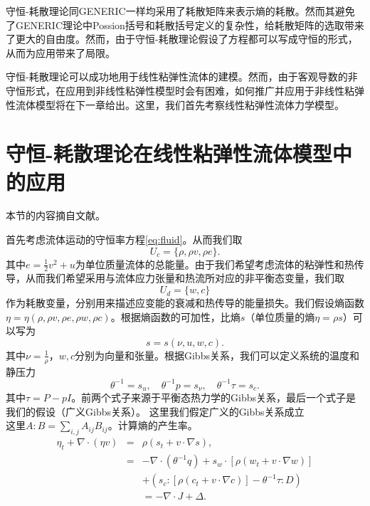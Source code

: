 \documentclass{article}
\begin{document}
	守恒-耗散理论同GENERIC一样均采用了耗散矩阵来表示熵的耗散。然而其避免了GENERIC理论中Possion括号和耗散括号定义的复杂性，给耗散矩阵的选取带来了更大的自由度。然而，由于守恒-耗散理论假设了方程都可以写成守恒的形式，从而为应用带来了局限。

	守恒-耗散理论可以成功地用于线性粘弹性流体的建模。然而，由于客观导数的非守恒形式，在应用到非线性粘弹性模型时会有困难，如何推广并应用于非线性粘弹性流体模型将在下一章给出。这里，我们首先考察线性粘弹性流体力学模型。

	\section{守恒-耗散理论在线性粘弹性流体模型中的应用}
	本节的内容摘自文献\cite{}。

	首先考虑流体运动的守恒率方程\eqref{eq:fluid}。从而我们取
	\begin{equation*}
		U_c = \{\rho, \rho v, \rho e\}.
	\end{equation*}
	其中$e = \frac{1}{2} v^2 + u$为单位质量流体的总能量。由于我们希望考虑流体的粘弹性和热传导，从而我们希望采用与流体应力张量和热流所对应的非平衡态变量，我们取
	\begin{equation*}
		U_d = \{ w, c\}
	\end{equation*}
	作为耗散变量，分别用来描述应变能的衰减和热传导的能量损失。我们假设熵函数$\eta = \eta (\rho,\rho v ,\rho e, \rho w, \rho c)$。根据熵函数的可加性，比熵$s$（单位质量的熵$\eta = \rho s$）可以写为
	\begin{equation}
		s = s(\nu, u, w, c).
	\end{equation}
	其中$\nu = \frac{1}{\rho}$，$w,c$分别为向量和张量。根据Gibbs关系，我们可以定义系统的温度和静压力
	\begin{equation}
		\theta^{-1} = s_u, \quad \theta^{-1} p = s_{\nu}, \quad \theta^{-1} \tau = s_c.
	\end{equation}
	其中$\tau = P - pI$。前两个式子来源于平衡态热力学的Gibbs关系，最后一个式子是我们的假设（广义Gibbs关系）。
	这里我们假定广义的Gibbs关系成立
	\begin{equation*}
   	\end{equation*}
	这里$A:B = \sum_{i,j}A_{ij}B_{ij}$。计算熵的产生率。
	\begin{eqnarray*}
		\eta_t + \nabla \cdot (\eta v) &=& \rho (s_t + v \cdot \nabla s), \\
		&=& -\nabla \cdot (\theta^{-1} q) + s_w \cdot [\rho (w_t + v \cdot \nabla w)] \\
		&&+ (s_c:[\rho (c_t + v \cdot \nabla c)] - \theta^{-1} \tau : D) \\
		&& = -\nabla \cdot J + \Delta.
	\end{eqnarray*}
\end{document}
